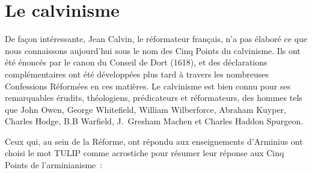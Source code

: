 \section{Le calvinisme}

De façon intéressante, Jean Calvin, le réformateur français, n'a pas élaboré
 ce que nous connaissons aujourd'hui sous le nom des Cinq Points du calvinisme.
 Ils ont été énoncés par le canon du Conseil de Dort (1618), et des déclarations
 complémentaires ont été développées plus tard à travers les nombreuses
 Confessions Réformées en ces matières. Le calvinisme est bien connu
 pour 
 ses remarquables érudits, théologiens, prédicateurs et réformateurs,
 des hommes tels que John Owen, George Whitefield,
 William Wilberforce, Abraham Kuyper, Charles Hodge, B.B Warfield,
 J.~Gresham Machen et Charles Haddon Spurgeon.

Ceux qui, au sein de la Réforme, ont répondu aux enseignements d'Arminius
 ont choisi le mot \og TULIP \fg{} comme acrostiche pour résumer
 leur réponse aux Cinq Points de l'arminianisme~:

